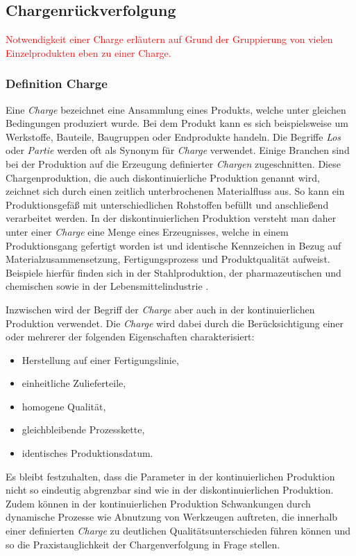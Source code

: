 \subsection{Chargenrückverfolgung} \label{sec:batch-traceability}
\textcolor{red}{Notwendigkeit einer Charge erläutern auf Grund der Gruppierung von vielen Einzelprodukten eben zu einer Charge.}

\subsubsection{Definition Charge}

Eine \textit{Charge} bezeichnet eine Ansammlung eines Produkts, welche unter gleichen Bedingungen produziert wurde. Bei dem Produkt kann es sich beispielsweise um Werkstoffe, Bauteile, Baugruppen oder Endprodukte handeln. Die Begriffe \textit{Los} oder \textit{Partie} werden oft als Synonym für \textit{Charge} verwendet. Einige Branchen sind bei der Produktion auf die Erzeugung definierter \textit{Chargen} zugeschnitten. Diese Chargenproduktion, die auch diskontinuierliche Produktion genannt wird, zeichnet sich durch einen zeitlich unterbrochenen Materialfluss aus. So kann ein Produktionsgefäß mit unterschiedlichen Rohstoffen befüllt und anschließend verarbeitet werden. In der diskontinuierlichen Produktion versteht man daher unter einer \textit{Charge} eine Menge eines Erzeugnisses, welche in einem Produktionsgang gefertigt worden ist und identische Kennzeichen in Bezug auf Materialzusammensetzung, Fertigungsprozess und Produktqualität aufweist. Beispiele hierfür finden sich in der Stahlproduktion, der pharmazeutischen und chemischen sowie in der Lebensmittelindustrie \citep{Guenther2012}.

Inzwischen wird der Begriff der \textit{Charge} aber auch in der kontinuierlichen Produktion verwendet. Die \textit{Charge} wird dabei durch die Berücksichtigung einer oder mehrerer der folgenden Eigenschaften charakterisiert:

\begin{itemize}
  \item Herstellung auf einer Fertigungslinie,
  \item einheitliche Zulieferteile,
  \item homogene Qualität,
  \item gleichbleibende Prozesskette,
  \item identisches Produktionsdatum.
\end{itemize}

Es bleibt festzuhalten, dass die Parameter in der kontinuierlichen Produktion nicht so eindeutig abgrenzbar sind wie in der diskontinuierlichen Produktion. Zudem können in der kontinuierlichen Produktion Schwankungen durch dynamische Prozesse wie Abnutzung von Werkzeugen auftreten, die innerhalb einer definierten \textit{Charge} zu deutlichen Qualitätsunterschieden führen können und so die Praxistauglichkeit der Chargenverfolgung in Frage stellen.

